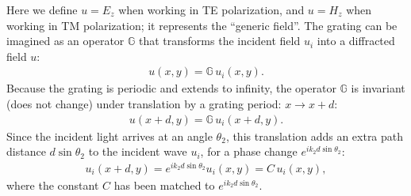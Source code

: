 Here we define $u = E_z$ when working in TE polarization, and $u = H_z$ when working in TM polarization; it represents the ``generic field''.  The grating can be imagined as an operator $\mathbb{G}$ that transforms the incident field $u_i$ into a diffracted field $u$:
\begin{align}
u(x,y) = \mathbb{G} \, u_i(x,y).
\end{align}
Because the grating is periodic and extends to infinity, the operator $\mathbb{G}$ is invariant (does not change) under translation by a grating period: $x \rightarrow x+d$:
\begin{align}
u(x+d,y) = \mathbb{G} \, u_i(x+d,y).
\end{align}
Since the incident light arrives at an angle $\theta_2$, this translation adds an extra path distance $d \sin \theta_2$ to the incident wave $u_i$, for a phase change $e^{i k_2 d \sin \theta_2}$:
\begin{align}
u_i(x+d, y) = e^{i k_2 d \sin \theta_2} u_i(x, y) = C \, u_i(x,y),
\end{align}
where the constant $C$ has been matched to $e^{i k_2 d \sin \theta_2}$.


